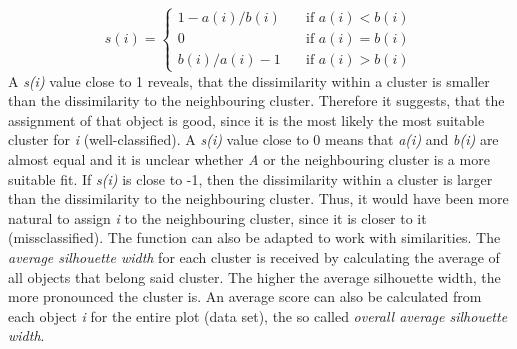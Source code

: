   \[ s(i) =
  \begin{cases}
    1 - a(i)/b(i)       & \quad \text{if } a(i) < b(i)\\
    0       & \quad \text{if } a(i) = b(i)\\
 b(i)/a(i) - 1      & \quad \text{if } a(i) > b(i)

  \end{cases}
\]
A \textit{s(i)} value close to 1 reveals, that the dissimilarity within a cluster is smaller than the dissimilarity to the neighbouring cluster. Therefore it suggests, that the assignment of that object is good, since it is the most likely the most suitable cluster for \textit{i} (well-classified). A \textit{s(i)} value close to 0 means that \textit{a(i)} and \textit{b(i)} are almost equal and it is unclear whether \textit{A} or the neighbouring cluster is a more suitable fit. If \textit{s(i)} is close to -1, then the dissimilarity within a cluster is larger than the dissimilarity to the neighbouring cluster. Thus, it would have been more natural to assign \textit{i} to the neighbouring cluster, since it is closer to it (missclassified). The function can also be adapted to work with similarities.
The \textit{average silhouette width} for each cluster is received by calculating the average of all objects that belong said cluster. The higher the average silhouette width, the more pronounced the cluster is. An average score can also be calculated from each object \textit{i} for the entire plot (data set), the so called \textit{overall average silhouette width}. 




  


